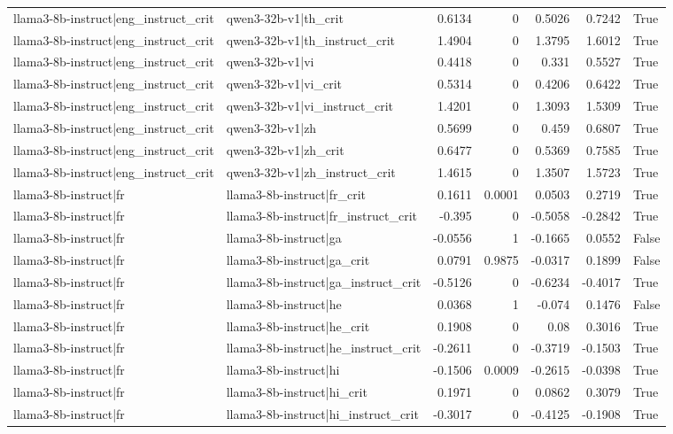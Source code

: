 \begin{table}
\begin{tabular}{l l r r r r l}
llama3-8b-instruct|eng_instruct_crit & qwen3-32b-v1|th_crit & 0.6134 & 0 & 0.5026 & 0.7242 & True \\
llama3-8b-instruct|eng_instruct_crit & qwen3-32b-v1|th_instruct_crit & 1.4904 & 0 & 1.3795 & 1.6012 & True \\
llama3-8b-instruct|eng_instruct_crit & qwen3-32b-v1|vi & 0.4418 & 0 & 0.331 & 0.5527 & True \\
llama3-8b-instruct|eng_instruct_crit & qwen3-32b-v1|vi_crit & 0.5314 & 0 & 0.4206 & 0.6422 & True \\
llama3-8b-instruct|eng_instruct_crit & qwen3-32b-v1|vi_instruct_crit & 1.4201 & 0 & 1.3093 & 1.5309 & True \\
llama3-8b-instruct|eng_instruct_crit & qwen3-32b-v1|zh & 0.5699 & 0 & 0.459 & 0.6807 & True \\
llama3-8b-instruct|eng_instruct_crit & qwen3-32b-v1|zh_crit & 0.6477 & 0 & 0.5369 & 0.7585 & True \\
llama3-8b-instruct|eng_instruct_crit & qwen3-32b-v1|zh_instruct_crit & 1.4615 & 0 & 1.3507 & 1.5723 & True \\
llama3-8b-instruct|fr & llama3-8b-instruct|fr_crit & 0.1611 & 0.0001 & 0.0503 & 0.2719 & True \\
llama3-8b-instruct|fr & llama3-8b-instruct|fr_instruct_crit & -0.395 & 0 & -0.5058 & -0.2842 & True \\
llama3-8b-instruct|fr & llama3-8b-instruct|ga & -0.0556 & 1 & -0.1665 & 0.0552 & False \\
llama3-8b-instruct|fr & llama3-8b-instruct|ga_crit & 0.0791 & 0.9875 & -0.0317 & 0.1899 & False \\
llama3-8b-instruct|fr & llama3-8b-instruct|ga_instruct_crit & -0.5126 & 0 & -0.6234 & -0.4017 & True \\
llama3-8b-instruct|fr & llama3-8b-instruct|he & 0.0368 & 1 & -0.074 & 0.1476 & False \\
llama3-8b-instruct|fr & llama3-8b-instruct|he_crit & 0.1908 & 0 & 0.08 & 0.3016 & True \\
llama3-8b-instruct|fr & llama3-8b-instruct|he_instruct_crit & -0.2611 & 0 & -0.3719 & -0.1503 & True \\
llama3-8b-instruct|fr & llama3-8b-instruct|hi & -0.1506 & 0.0009 & -0.2615 & -0.0398 & True \\
llama3-8b-instruct|fr & llama3-8b-instruct|hi_crit & 0.1971 & 0 & 0.0862 & 0.3079 & True \\
llama3-8b-instruct|fr & llama3-8b-instruct|hi_instruct_crit & -0.3017 & 0 & -0.4125 & -0.1908 & True \\

\end{tabular}
\end{table}

